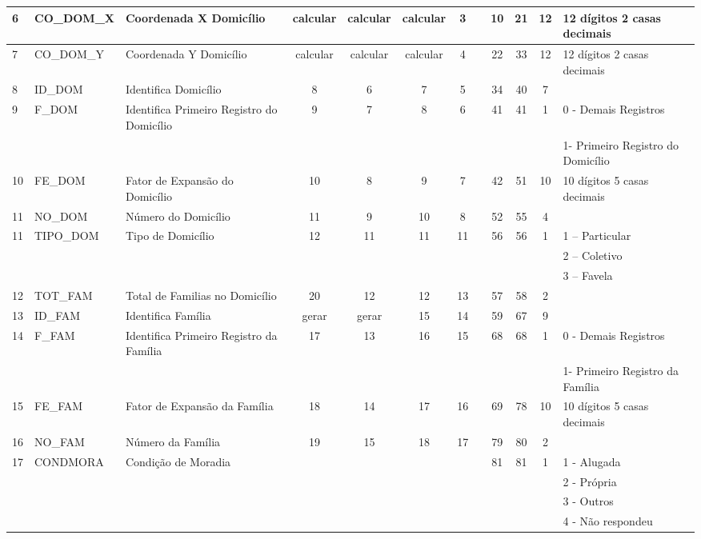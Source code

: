 \begin{table}[htbp]
\begin{center}
\begin{tabular}{|p{1cm}|l|l|c|c|c|c|c|c|c|c|l|}
6 & CO\_DOM\_X & Coordenada X Domicílio & calcular & calcular & calcular & 3 &  & 10 & 21 & 12 & 12 dígitos 2 casas decimais \\ \hline
7 & CO\_DOM\_Y & Coordenada Y Domicílio & calcular & calcular & calcular & 4 &  & 22 & 33 & 12 & 12 dígitos 2 casas decimais \\ \hline
8 & ID\_DOM & Identifica Domicílio & 8 & 6 & 7 & 5 &  & 34 & 40 & 7 &  \\ \hline
9 & F\_DOM & Identifica Primeiro Registro do Domicílio & 9 & 7 & 8 & 6 &  & 41 & 41 & 1 & 0 - Demais Registros \\ \hline
 &  &  &  &  &  &  &  &  &  &  & 1- Primeiro Registro do Domicílio \\ \hline
10 & FE\_DOM & Fator de Expansão do Domicílio & 10 & 8 & 9 & 7 &  & 42 & 51 & 10 & 10 dígitos 5 casas decimais \\ \hline
11 & NO\_DOM & Número do Domicílio & 11 & 9 & 10 & 8 &  & 52 & 55 & 4 &  \\ \hline
11 & TIPO\_DOM & Tipo de Domicílio & 12 & 11 & 11 & 11 &  & 56 & 56 & 1 & 1 – Particular \\ \hline
 &  &  &  &  &  &  &  &  &  &  & 2 – Coletivo \\ \hline
 &  &  &  &  &  &  &  &  &  &  & 3 – Favela \\ \hline
12 & TOT\_FAM & Total de Familias no Domicílio & 20 & 12 & 12 & 13 &  & 57 & 58 & 2 &  \\ \hline
13 & ID\_FAM & Identifica Família & gerar & gerar & 15 & 14 &  & 59 & 67 & 9 &  \\ \hline
14 & F\_FAM & Identifica Primeiro Registro da Família & 17 & 13 & 16 & 15 &  & 68 & 68 & 1 & 0 - Demais Registros \\ \hline
 &  &  &  &  &  &  &  &  &  &  & 1- Primeiro Registro da Família \\ \hline
15 & FE\_FAM & Fator de Expansão da Família & 18 & 14 & 17 & 16 &  & 69 & 78 & 10 & 10 dígitos 5 casas decimais \\ \hline
16 & NO\_FAM & Número da Família & 19 & 15 & 18 & 17 &  & 79 & 80 & 2 &  \\ \hline
17 & CONDMORA & Condição de Moradia &  &  &  &  &  & 81 & 81 & 1 & 1 - Alugada \\ \hline
 &  &  &  &  &  &  &  &  &  &  & 2 - Própria \\ \hline
 &  &  &  &  &  &  &  &  &  &  & 3 - Outros \\ \hline
 &  &  &  &  &  &  &  &  &  &  & 4 - Não respondeu \\ \hline

\end{tabular}
\end{center}
\end{table}
